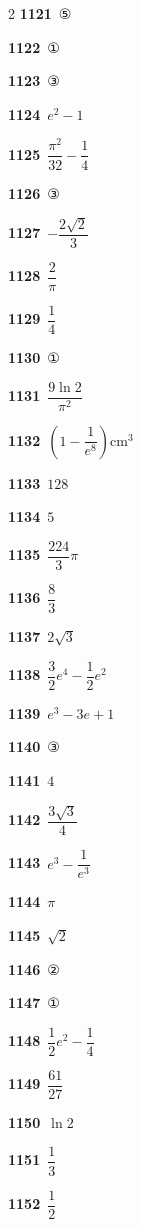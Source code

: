 \documentclass[10pt,a4paper]{article}
\begin{document}
\begin{multicols}{2}
\noindent\textbf{1121}\ ⑤\par
\noindent\textbf{1122}\ ①\par
\noindent\textbf{1123}\ ③\par
\noindent\textbf{1124}\ $e^2-1$\par
\noindent\textbf{1125}\ $\dfrac{\pi^2}{32}-\dfrac{1}{4}$\par
\noindent\textbf{1126}\ ③\par
\noindent\textbf{1127}\ $-\dfrac{2\sqrt{2}}{3}$\par
\noindent\textbf{1128}\ $\dfrac{2}{\pi}$\par
\noindent\textbf{1129}\ $\dfrac{1}{4}$\par
\noindent\textbf{1130}\ ①\par
\noindent\textbf{1131}\ $\dfrac{9\ln 2}{\pi^2}$\par
\noindent\textbf{1132}\ $\left(1-\dfrac{1}{e^8}\right)\mathrm{cm}^3$\par
\noindent\textbf{1133}\ $128$\par
\noindent\textbf{1134}\ $5$\par
\noindent\textbf{1135}\ $\dfrac{224}{3}\pi$\par
\noindent\textbf{1136}\ $\dfrac{8}{3}$\par
\noindent\textbf{1137}\ $2\sqrt{3}$\par
\noindent\textbf{1138}\ $\dfrac{3}{2}e^4-\dfrac{1}{2}e^2$\par
\noindent\textbf{1139}\ $e^3-3e+1$\par
\noindent\textbf{1140}\ ③\par
\noindent\textbf{1141}\ $4$\par
\noindent\textbf{1142}\ $\dfrac{3\sqrt{3}}{4}$\par
\noindent\textbf{1143}\ $e^3-\dfrac{1}{e^3}$\par
\noindent\textbf{1144}\ $\pi$\par
\noindent\textbf{1145}\ $\sqrt{2}$\par
\noindent\textbf{1146}\ ②\par
\noindent\textbf{1147}\ ①\par
\noindent\textbf{1148}\ $\dfrac{1}{2}e^2-\dfrac{1}{4}$\par
\noindent\textbf{1149}\ $\dfrac{61}{27}$\par
\noindent\textbf{1150}\ $\ln 2$\par
\noindent\textbf{1151}\ $\dfrac{1}{3}$\par
\noindent\textbf{1152}\ $\dfrac{1}{2}$\par

\end{multicols}
\end{document}
